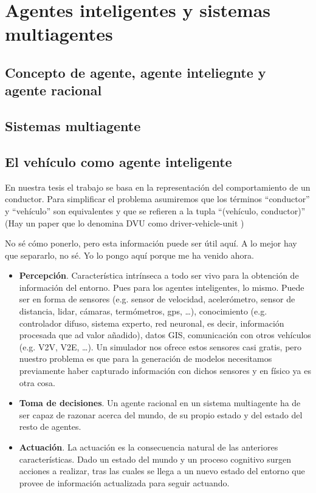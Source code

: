 \chapter{Agentes inteligentes y sistemas multiagentes}
\label{ch:sota-agents-and-mas}

\section{Concepto de agente, agente inteliegnte y agente racional}

\section{Sistemas multiagente}
\label{ch:sota-agents-and-mas:s:mas}


\section{El vehículo como agente inteligente}

En nuestra tesis el trabajo se basa en la representación del comportamiento de un conductor. Para simplificar el problema asumiremos que los términos \enquote{conductor} y \enquote{vehículo} son equivalentes y que se refieren a la tupla \enquote{(vehículo, conductor)} (Hay un paper que lo denomina DVU como driver-vehicle-unit \cite{Dia2002})

No sé cómo ponerlo, pero esta información puede ser útil aquí. A lo mejor hay que separarlo, no sé. Yo lo pongo aquí porque me ha venido ahora.

\begin{itemize}
	\item \textbf{Percepción}. Característica intrínseca a todo ser vivo para la obtención de información del entorno. Pues para los agentes inteligentes, lo mismo. Puede ser en forma de sensores (e.g. sensor de velocidad, acelerómetro, sensor de distancia, lidar, cámaras, termómetros, gps, \ldots), conocimiento (e.g. controlador difuso, sistema experto, red neuronal, es decir, información procesada que ad valor añadido), datos GIS, comunicación con otros vehículos (e.g. V2V, V2E, \ldots). Un simulador nos ofrece estos sensores casi gratis, pero nuestro problema es que para la generación de modelos necesitamos previamente haber capturado información con dichos sensores y en físico ya es otra cosa.
	\item \textbf{Toma de decisiones}. Un agente racional en un sistema multiagente ha de ser capaz de razonar acerca del mundo, de su propio estado y del estado del resto de agentes.
	\item \textbf{Actuación}. La actuación es la consecuencia natural de las anteriores características. Dado un estado del mundo y un proceso cognitivo surgen acciones a realizar, tras las cuales se llega a un nuevo estado del entorno que provee de información actualizada para seguir actuando.
\end{itemize}
